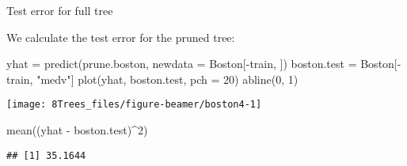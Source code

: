 \documentclass[
  10pt,
  ignorenonframetext,
]{beamer}
\newenvironment{Shaded}{\begin{snugshade}}{\end{snugshade}}
\newcommand{\AttributeTok}[1]{\textcolor[rgb]{0.77,0.63,0.00}{#1}}
\newcommand{\DecValTok}[1]{\textcolor[rgb]{0.00,0.00,0.81}{#1}}
\newcommand{\FunctionTok}[1]{\textcolor[rgb]{0.00,0.00,0.00}{#1}}
\newcommand{\NormalTok}[1]{#1}
\newcommand{\OtherTok}[1]{\textcolor[rgb]{0.56,0.35,0.01}{#1}}
\newcommand{\SpecialCharTok}[1]{\textcolor[rgb]{0.00,0.00,0.00}{#1}}
\newcommand{\StringTok}[1]{\textcolor[rgb]{0.31,0.60,0.02}{#1}}
\begin{document}
\begin{frame}[fragile]
\begin{block}{Test error for full tree}
\protect\hypertarget{test-error-for-full-tree}{}
\(~\)

We calculate the test error for the pruned tree:

\vspace{2mm}

\scriptsize

\begin{Shaded}
\begin{Highlighting}[]
\NormalTok{yhat }\OtherTok{=} \FunctionTok{predict}\NormalTok{(prune.boston, }\AttributeTok{newdata =}\NormalTok{ Boston[}\SpecialCharTok{{-}}\NormalTok{train, ])}
\NormalTok{boston.test }\OtherTok{=}\NormalTok{ Boston[}\SpecialCharTok{{-}}\NormalTok{train, }\StringTok{"medv"}\NormalTok{]}
\FunctionTok{plot}\NormalTok{(yhat, boston.test, }\AttributeTok{pch =} \DecValTok{20}\NormalTok{)}
\FunctionTok{abline}\NormalTok{(}\DecValTok{0}\NormalTok{, }\DecValTok{1}\NormalTok{)}
\end{Highlighting}
\end{Shaded}

\begin{center}\texttt{[image: 8Trees\_files/figure-beamer/boston4-1]} \end{center}

\begin{Shaded}
\begin{Highlighting}[]
\FunctionTok{mean}\NormalTok{((yhat }\SpecialCharTok{{-}}\NormalTok{ boston.test)}\SpecialCharTok{\^{}}\DecValTok{2}\NormalTok{)}
\end{Highlighting}
\end{Shaded}

\begin{verbatim}
## [1] 35.1644
\end{verbatim}
\end{block}
\end{frame}
\end{document}
